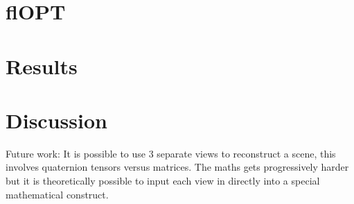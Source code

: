 \section{flOPT}

\section{Results}
\section{Discussion}
Future work:
It is possible to use 3 separate views to reconstruct a scene, this involves quaternion tensors versus matrices.
The maths gets progressively harder but it is theoretically possible to input each view in directly into a special mathematical construct.

